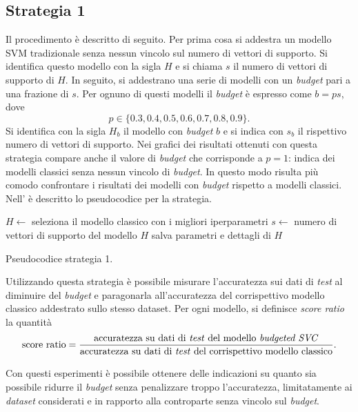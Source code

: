 \subsection{Strategia 1}
Il procedimento è descritto di seguito. Per prima cosa si addestra un modello SVM tradizionale senza nessun vincolo sul numero di vettori di supporto. 
Si identifica questo modello con la sigla $H$ e si chiama $s$ il numero di vettori di supporto di $H$.
In seguito, si addestrano una serie di modelli con un \emph{budget} pari a una frazione di $s$.
Per ognuno di questi modelli il \emph{budget} è espresso come $b=ps$, dove
\begin{equation*}
    p\in\{0.3, 0.4, 0.5, 0.6, 0.7, 0.8, 0.9\}.
\end{equation*}
Si identifica con la sigla $H_b$ il modello con \emph{budget} $b$ e si indica con $s_b$ il rispettivo numero di vettori di supporto.
Nei grafici dei risultati ottenuti con questa strategia compare anche il valore di \emph{budget} che corrisponde a $p=1$: indica dei modelli classici senza nessun vincolo di \emph{budget}. In questo modo risulta più comodo confrontare i risultati dei modelli con \emph{budget} rispetto a modelli classici.
Nell' è descritto lo pseudocodice per la strategia.
\begin{algorithm}[t]
    \SetAlgoLined
    $H \gets$ seleziona il modello classico con i migliori iperparametri\;
    $s \gets$ numero di vettori di supporto del modello $H$\;
    salva parametri e dettagli di $H$\;
\caption{Pseudocodice strategia 1.}
\label{alg:esperimenti_1}
\end{algorithm}

Utilizzando questa strategia è possibile misurare l'accuratezza sui dati di \emph{test} al diminuire del \emph{budget} e paragonarla all'accuratezza del corrispettivo modello classico addestrato sullo stesso dataset.
Per ogni modello, si definisce \emph{score ratio} la quantità
\begin{equation*}
    \text{score ratio} = \frac{\text{accuratezza su dati di \emph{test} del modello \emph{budgeted SVC}}}{\text{accuratezza su dati di \emph{test} del corrispettivo modello classico}}.
\end{equation*}

Con questi esperimenti è possibile ottenere delle indicazioni su quanto sia possibile ridurre il \emph{budget} senza penalizzare troppo l'accuratezza, limitatamente ai \emph{dataset} considerati e in rapporto alla controparte senza vincolo sul \emph{budget}.

